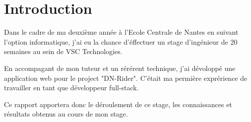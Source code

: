 \chapter*{Introduction}
\label{chap:Introduction}

Dans le cadre de ma deuxième année à l'Ecole Centrale de Nantes en suivant l'option informatique, j'ai eu la chance d'éffectuer un stage d'ingénieur de 20 semaines au sein de VSC Technologies.

En accompagant de mon tuteur et un rérérent technique, j'ai dévoloppé une application web pour le project "DN-Rider". C'était ma permière exprérience de travailler en tant que développeur full-stack.

Ce rapport apportera donc le déroulement de ce stage, les connaissances et résultats obtenus au cours de mon stage.
